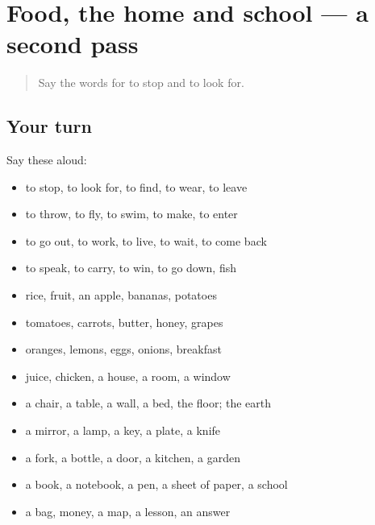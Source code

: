 \section[(dialogue)]{Food, the home and school — a second pass}

\label{lesson:AR-R74-second-pass-food-the-home-and-school}



\begin{quote}
Say the words for to stop and to look for.
\end{quote}

\subsection*{Your turn}
Say these aloud:

\begin{itemize}
\raggedright
  \item to stop, to look for, to find, to wear, to leave
  \item to throw, to fly, to swim, to make, to enter
  \item to go out, to work, to live, to wait, to come back
  \item to speak, to carry, to win, to go down, fish
  \item rice, fruit, an apple, bananas, potatoes
  \item tomatoes, carrots, butter, honey, grapes
  \item oranges, lemons, eggs, onions, breakfast
  \item juice, chicken, a house, a room, a window
  \item a chair, a table, a wall, a bed, the floor; the earth
  \item a mirror, a lamp, a key, a plate, a knife
  \item a fork, a bottle, a door, a kitchen, a garden
  \item a book, a notebook, a pen, a sheet of paper, a school
  \item a bag, money, a map, a lesson, an answer
\end{itemize}

